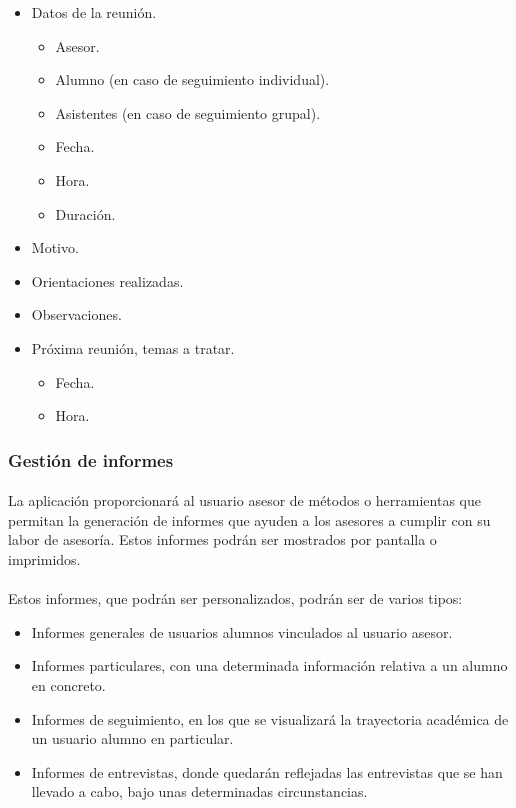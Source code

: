       \begin{itemize}
         \item Datos de la reunión.
         \begin{itemize}
            \item Asesor.
            \item Alumno (en caso de seguimiento individual).
            \item Asistentes (en caso de seguimiento grupal).
            \item Fecha.
            \item Hora.
            \item Duración.
         \end{itemize}
         \item Motivo.
         \item Orientaciones realizadas.
         \item Observaciones.
         \item Próxima reunión, temas a tratar.
         \begin{itemize}
            \item Fecha.
            \item Hora.
         \end{itemize}
      \end{itemize}

      \subsubsection{Gestión de informes}

      \paragraph{}La aplicación proporcionará al usuario asesor de métodos o
      herramientas que permitan la generación de informes que ayuden a los
      asesores a cumplir con su labor de asesoría. Estos informes podrán ser
      mostrados por pantalla o imprimidos.

      \paragraph{}Estos informes, que podrán ser personalizados, podrán ser
      de varios tipos:

      \begin{itemize}
       \item Informes generales de usuarios alumnos vinculados al usuario
             asesor.
       \item Informes particulares, con una determinada información relativa a
             un alumno en concreto.
       \item Informes de seguimiento, en los que se visualizará la trayectoria
             académica de un usuario alumno en particular.
       \item Informes de entrevistas, donde quedarán reflejadas las entrevistas
             que se han llevado a cabo, bajo unas determinadas circunstancias.
      \end{itemize}


